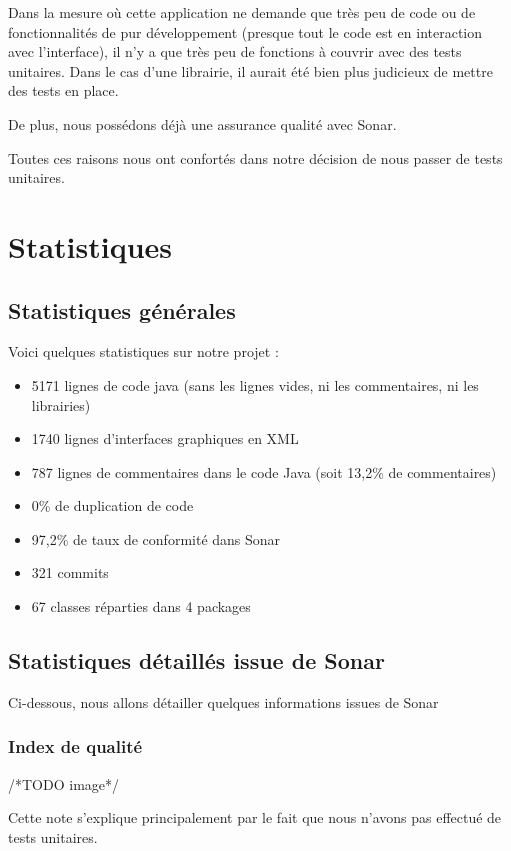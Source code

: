 \documentclass{report}
\begin{document}
Dans la mesure où cette application ne demande que très peu de code ou de fonctionnalités de pur développement (presque tout le code est en interaction avec l’interface), il n’y a que très peu de fonctions à couvrir avec des tests unitaires. Dans le cas d’une librairie, il aurait été bien plus judicieux de mettre des tests en place.

De plus, nous possédons déjà une assurance qualité avec Sonar.

Toutes ces raisons nous ont confortés dans notre décision de nous passer de tests unitaires.

\section{Statistiques}

\subsection{Statistiques générales}

Voici quelques statistiques sur notre projet :
\begin{itemize}
\item 5171 lignes de code java (sans les lignes vides, ni les commentaires, ni les librairies)
\item 1740 lignes d’interfaces graphiques en XML
\item 787 lignes de commentaires dans le code Java (soit 13,2\% de commentaires)
\item 0\% de duplication de code
\item 97,2\% de taux de conformité dans Sonar
\item 321 commits
\item 67 classes réparties dans 4 packages
\end{itemize}

\subsection{Statistiques détaillés issue de Sonar}

Ci-dessous, nous allons détailler quelques informations issues de Sonar

\subsubsection{Index de qualité}

/*TODO image*/

Cette note s’explique principalement par le fait que nous n’avons pas effectué de tests unitaires.
\end{document}
